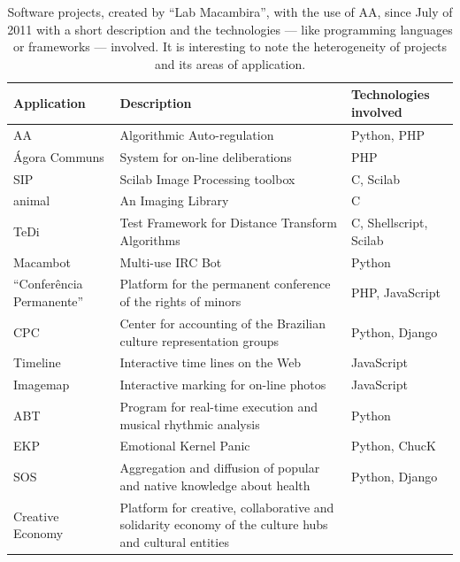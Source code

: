 \documentclass[letterpaper]{article}
\begin{document}
\begin{table}
    \caption{Software projects, created by ``Lab Macambira'', with the use of AA, since July
      of 2011 with a short description and the technologies --- like
      programming languages or frameworks --- involved. It is
      interesting to note the heterogeneity of projects and its areas
      of application.}
    \small\begin{tabular}{|l|p{5cm}|l|}
        \hline
        Application & Description & Technologies involved \\ 
        \hline \hline
        AA            & Algorithmic Auto-regulation      & Python, PHP \\
        \hline
        \'{A}gora Communs & System for on-line deliberations & PHP \\
        \hline
        SIP           & Scilab Image Processing toolbox & C, Scilab \\
        \hline
        animal        & An Imaging Library              & C \\
        \hline
        TeDi          & Test Framework for Distance Transform
        Algorithms & C, Shellscript, Scilab \\
        \hline
        Macambot      & Multi-use IRC Bot               & Python \\
        \hline
        ``Confer\^{e}ncia Permanente'' & Platform for the permanent
        conference of the rights of minors & PHP, JavaScript \\
        \hline
        CPC           & Center for accounting of the Brazilian culture
        representation groups & Python, Django \\
        \hline
        Timeline      & Interactive time lines on the Web & JavaScript
        \\
        \hline
        Imagemap      & Interactive marking for on-line photos &
        JavaScript \\
        \hline
        ABT           & Program for real-time execution and musical
        rhythmic analysis & Python \\
        \hline
        EKP           & Emotional Kernel Panic & Python, ChucK \\
        \hline
        SOS           & Aggregation and diffusion of popular and native
        knowledge about health & Python, Django \\
        \hline
        Creative Economy & Platform for creative, collaborative and
        solidarity economy of the culture hubs and cultural entities &

\end{tabular}
\end{table}
\end{document}
